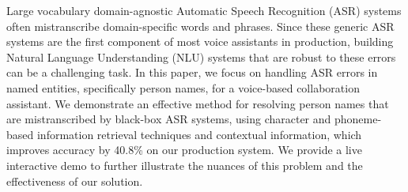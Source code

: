 Large vocabulary domain-agnostic Automatic Speech Recognition (ASR) systems often mistranscribe domain-specific words and phrases. Since these generic ASR systems are the first component of most voice assistants in production, building Natural Language Understanding (NLU) systems that are robust to these errors can be a challenging task. In this paper, we focus on handling ASR errors in named entities, specifically person names, for a voice-based collaboration assistant. We demonstrate an effective method for resolving person names that are mistranscribed by black-box ASR systems, using character and phoneme-based information retrieval techniques and contextual information, which improves accuracy by 40.8\% on our production system. We provide a live interactive demo to further illustrate the nuances of this problem and the effectiveness of our solution.